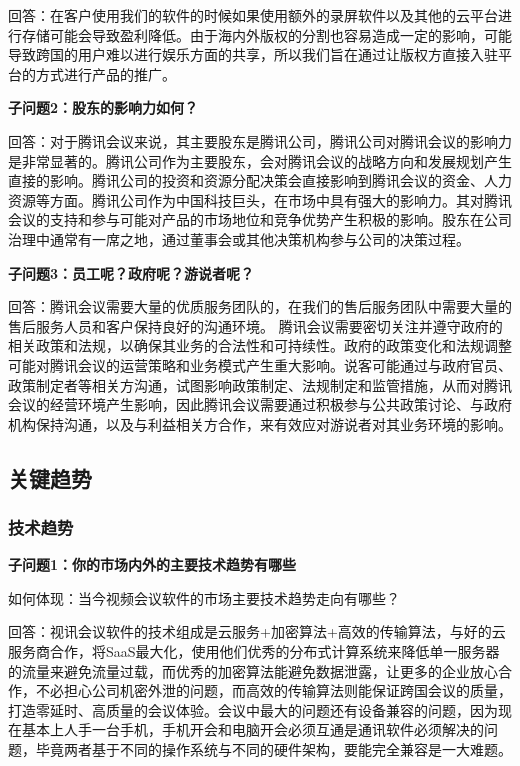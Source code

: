 \documentclass[a4paper,12pt]{article}
\begin{document}
    回答：在客户使⽤我们的软件的时候如果使⽤额外的录屏软件以及其他的云平台进⾏存储可能会导致盈利降低。由于海内外版权的分割也容易造成⼀定的影响，可能导致跨国的⽤户难以进⾏娱乐⽅⾯的共享，所以我们旨在通过让版权⽅直接⼊驻平台的⽅式进⾏产品的推⼴。

    \textbf{子问题2：股东的影响力如何？}

    回答：对于腾讯会议来说，其主要股东是腾讯公司，腾讯公司对腾讯会议的影响力是非常显著的。腾讯公司作为主要股东，会对腾讯会议的战略方向和发展规划产生直接的影响。腾讯公司的投资和资源分配决策会直接影响到腾讯会议的资金、人力资源等方面。腾讯公司作为中国科技巨头，在市场中具有强大的影响力。其对腾讯会议的支持和参与可能对产品的市场地位和竞争优势产生积极的影响。股东在公司治理中通常有一席之地，通过董事会或其他决策机构参与公司的决策过程。


    \textbf{子问题3：员工呢？政府呢？游说者呢？}

    回答：腾讯会议需要⼤量的优质服务团队的，在我们的售后服务团队中需要⼤量的售后服务⼈员和客户保持良好的沟通环境。
    腾讯会议需要密切关注并遵守政府的相关政策和法规，以确保其业务的合法性和可持续性。政府的政策变化和法规调整可能对腾讯会议的运营策略和业务模式产生重大影响。说客可能通过与政府官员、政策制定者等相关方沟通，试图影响政策制定、法规制定和监管措施，从而对腾讯会议的经营环境产生影响，因此腾讯会议需要通过积极参与公共政策讨论、与政府机构保持沟通，以及与利益相关方合作，来有效应对游说者对其业务环境的影响。
    
    \subsection{关键趋势}
    \subsubsection{技术趋势}
    \textbf{子问题1：你的市场内外的主要技术趋势有哪些}

    如何体现：当今视频会议软件的市场主要技术趋势⾛向有哪些？

    回答：视讯会议软件的技术组成是云服务+加密算法+⾼效的传输算法，与好的云服务商合作，将SaaS最⼤化，使⽤他们优秀的分布式计算系统来降低单⼀服务器的流量来避免流量过载，⽽优秀的加密算法能避免数据泄露，让更多的企业放⼼合作，不必担⼼公司机密外泄的问题，⽽⾼效的传输算法则能保证跨国会议的质量，打造零延时、⾼质量的会议体验。会议中最⼤的问题还有设备兼容的问题，因为现在基本上⼈⼿⼀台⼿机，⼿机开会和电脑开会必须互通是通讯软件必须解决的问题，毕竟两者基于不同的操作系统与不同的硬件架构，要能完全兼容是⼀⼤难题。
\end{document}
